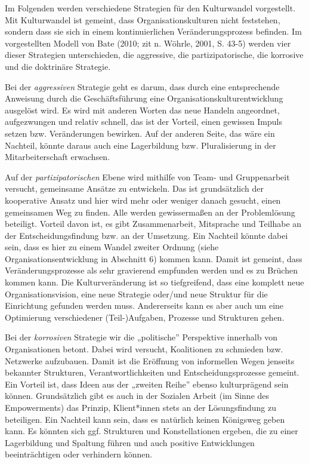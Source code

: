 \documentclass[
  letterpaper,
]{book}
\begin{document}
Im Folgenden werden verschiedene Strategien für den Kulturwandel
vorgestellt. Mit Kulturwandel ist gemeint, dass Organisationskulturen
nicht feststehen, sondern dass sie sich in einem kontinuierlichen
Veränderungsprozess befinden. Im vorgestellten Modell von Bate (2010;
zit n. Wöhrle, 2001, S. 43-5) werden vier dieser Strategien
unterschieden, die aggressive, die partizipatorische, die korrosive und
die doktrinäre Strategie.

Bei der \emph{aggressiven} Strategie geht es darum, dass durch eine
entsprechende Anweisung durch die Geschäftsführung eine
Organisationskulturentwicklung ausgelöst wird. Es wird mit anderen
Worten das neue Handeln angeordnet, aufgezwungen und relativ schnell,
das ist der Vorteil, einen gewissen Impuls setzen bzw. Veränderungen
bewirken. Auf der anderen Seite, das wäre ein Nachteil, könnte daraus
auch eine Lagerbildung bzw. Pluralisierung in der Mitarbeiterschaft
erwachsen.

Auf der \emph{partizipatorischen} Ebene wird mithilfe von Team- und
Gruppenarbeit versucht, gemeinsame Ansätze zu entwickeln. Das ist
grundsätzlich der kooperative Ansatz und hier wird mehr oder weniger
danach gesucht, einen gemeinsamen Weg zu finden. Alle werden
gewissermaßen an der Problemlösung beteiligt. Vorteil davon ist, es gibt
Zusammenarbeit, Mitsprache und Teilhabe an der Entscheidungsfindung bzw.
an der Umsetzung. Ein Nachteil könnte dabei sein, dass es hier zu einem
Wandel zweiter Ordnung (siehe Organisationsentwicklung in Abschnitt 6)
kommen kann. Damit ist gemeint, dass Veränderungsprozesse als sehr
gravierend empfunden werden und es zu Brüchen kommen kann. Die
Kulturveränderung ist so tiefgreifend, dass eine komplett neue
Organisationsvision, eine neue Strategie oder/und neue Struktur für die
Einrichtung gefunden werden muss. Andererseits kann es aber auch um eine
Optimierung verschiedener (Teil-)Aufgaben, Prozesse und Strukturen
gehen.

Bei der \emph{korrosiven} Strategie wir die „politische'' Perspektive
innerhalb von Organisationen betont. Dabei wird versucht, Koalitionen zu
schmieden bzw. Netzwerke aufzubauen. Damit ist die Eröffnung von
informellen Wegen jenseits bekannter Strukturen, Verantwortlichkeiten
und Entscheidungsprozesse gemeint. Ein Vorteil ist, dass Ideen aus der
„zweiten Reihe'' ebenso kulturprägend sein können. Grundsätzlich gibt es
auch in der Sozialen Arbeit (im Sinne des Empowerments) das Prinzip,
Klient*innen stets an der Lösungsfindung zu beteiligen. Ein Nachteil
kann sein, dass es natürlich keinen Königsweg geben kann. Es könnten
sich ggf. Strukturen und Konstellationen ergeben, die zu einer
Lagerbildung und Spaltung führen und auch positive Entwicklungen
beeinträchtigen oder verhindern können.
\end{document}
